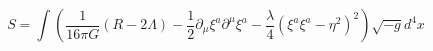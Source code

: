 \begin{equation}
\label{action}
S =\int \left( \frac{1}{16\pi G}(R- 2 \Lambda)
- \frac{1}{2}\partial_{\mu} \xi^a \partial^{\mu} \xi^a  - 
\frac{ \lambda}{4}(\xi^a\xi^a- \eta^2)^2   \right) \sqrt{-g} d^4 x
\end{equation}

